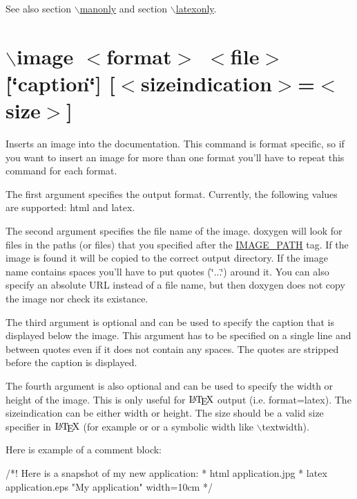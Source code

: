 \begin{DoxySeeAlso}{See also}
section \hyperlink{commands_cmdmanonly}{$\backslash$manonly} and section \hyperlink{commands_cmdlatexonly}{$\backslash$latexonly}.
\end{DoxySeeAlso}


 \hypertarget{commands_cmdimage}{}\section{$\backslash$image $<$format$>$ $<$file$>$ \mbox{[}\char`\"{}caption\char`\"{}\mbox{]} \mbox{[}$<$sizeindication$>$=$<$size$>$\mbox{]}}\label{commands_cmdimage}
 Inserts an image into the documentation. This command is format specific, so if you want to insert an image for more than one format you'll have to repeat this command for each format.

The first argument specifies the output format. Currently, the following values are supported: {\ttfamily html} and {\ttfamily latex}.

The second argument specifies the file name of the image. doxygen will look for files in the paths (or files) that you specified after the \hyperlink{config_cfg_image_path}{IMAGE\_\-PATH} tag. If the image is found it will be copied to the correct output directory. If the image name contains spaces you'll have to put quotes (\char`\"{}...\char`\"{}) around it. You can also specify an absolute URL instead of a file name, but then doxygen does not copy the image nor check its existance.

The third argument is optional and can be used to specify the caption that is displayed below the image. This argument has to be specified on a single line and between quotes even if it does not contain any spaces. The quotes are stripped before the caption is displayed.

The fourth argument is also optional and can be used to specify the width or height of the image. This is only useful for $\mbox{\LaTeX}$ output (i.e. format={\ttfamily latex}). The {\ttfamily sizeindication} can be either {\ttfamily width} or {\ttfamily height}. The size should be a valid size specifier in $\mbox{\LaTeX}$ (for example {\ttfamily 10cm} or {\ttfamily 6in} or a symbolic width like {\ttfamily $\backslash$textwidth}).

Here is example of a comment block:

\begin{DoxyVerb}
  /*! Here is a snapshot of my new application:
   *  \image html application.jpg
   *  \image latex application.eps "My application" width=10cm
   */
\end{DoxyVerb}


